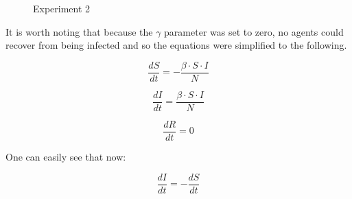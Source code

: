 \begin{figure}[H]
    \centering
    \hspace*{\fill}
    \hspace*{\fill}

    \caption{Experiment 2} \label{fig:experiment1}
\end{figure}

It is worth noting that because the $\gamma$ parameter was set to zero, no agents could recover from being infected and so the equations were simplified to the following.

\begin{equation} \label{eq:sir1_gamma0}
    \frac{{dS}}{{dt}} = -\frac{{\beta \cdot S \cdot I}}{{N}}
\end{equation}

\begin{equation} \label{eq:sir2_gamma0}
    \frac{{dI}}{{dt}} = \frac{{\beta \cdot S \cdot I}}{{N}}
\end{equation}

\begin{equation} \label{eq:sir3_gamma0}
    \frac{{dR}}{{dt}} = 0
\end{equation}

One can easily see that now:

\begin{equation}
    \frac{{dI}}{{dt}} = -\frac{{dS}}{{dt}}
\end{equation}

